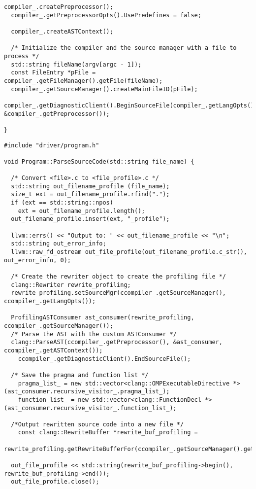 \documentclass[a4paper,10pt,twoside]{book}
\begin{document}
\begin{lstlisting}[language=CCC, caption=driver/compiler.cpp]
  compiler_.createPreprocessor();
  compiler_.getPreprocessorOpts().UsePredefines = false;

  compiler_.createASTContext();

  /* Initialize the compiler and the source manager with a file to process */
  std::string fileName(argv[argc - 1]);  
  const FileEntry *pFile = compiler_.getFileManager().getFile(fileName);
  compiler_.getSourceManager().createMainFileID(pFile);
  compiler_.getDiagnosticClient().BeginSourceFile(compiler_.getLangOpts(), &compiler_.getPreprocessor());

}
\end{lstlisting}

\begin{lstlisting}[language=CCC, caption=driver/program.cpp]
#include "driver/program.h"

void Program::ParseSourceCode(std::string file_name) {

  /* Convert <file>.c to <file_profile>.c */
  std::string out_filename_profile (file_name);
  size_t ext = out_filename_profile.rfind(".");
  if (ext == std::string::npos)
  	ext = out_filename_profile.length();
  out_filename_profile.insert(ext, "_profile");

  llvm::errs() << "Output to: " << out_filename_profile << "\n";
  std::string out_error_info;
  llvm::raw_fd_ostream out_file_profile(out_filename_profile.c_str(), out_error_info, 0);

  /* Create the rewriter object to create the profiling file */
  clang::Rewriter rewrite_profiling;
  rewrite_profiling.setSourceMgr(ccompiler_.getSourceManager(), ccompiler_.getLangOpts());
  
  ProfilingASTConsumer ast_consumer(rewrite_profiling, ccompiler_.getSourceManager());
  /* Parse the AST with the custom ASTConsumer */
  clang::ParseAST(ccompiler_.getPreprocessor(), &ast_consumer, ccompiler_.getASTContext());
	ccompiler_.getDiagnosticClient().EndSourceFile();

  /* Save the pragma and function list */
	pragma_list_ = new std::vector<clang::OMPExecutableDirective *>(ast_consumer.recursive_visitor_.pragma_list_);
	function_list_ = new std::vector<clang::FunctionDecl *>(ast_consumer.recursive_visitor_.function_list_);

  /*Output rewritten source code into a new file */
	const clang::RewriteBuffer *rewrite_buf_profiling = 
      rewrite_profiling.getRewriteBufferFor(ccompiler_.getSourceManager().getMainFileID());  	
  
  out_file_profile << std::string(rewrite_buf_profiling->begin(), rewrite_buf_profiling->end());
  out_file_profile.close();


\end{lstlisting}
\end{document}
